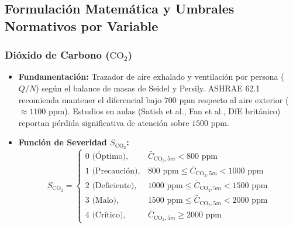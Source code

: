 \documentclass[11pt,a4paper]{article}
\begin{document}
\subsection{Formulación Matemática y Umbrales Normativos por Variable}

\subsubsection{Dióxido de Carbono (\texorpdfstring{$\text{CO}_2$}{CO2})}
\begin{itemize}
    \item \textbf{Fundamentación:} Trazador de aire exhalado y ventilación por persona ($Q/N$) según el balance de masas de Seidel y Persily. ASHRAE 62.1 recomienda mantener el diferencial bajo $700\text{ ppm}$ respecto al aire exterior ($\approx 1100\text{ ppm}$). Estudios en aulas (Satish et al., Fan et al., DfE británico) reportan pérdida significativa de atención sobre $1500\text{ ppm}$.
    \item \textbf{Función de Severidad $S_{\text{CO}_2}$:}
    \begin{equation}
    S_{\text{CO}_2} = \begin{cases}
    0\text{ (Óptimo)}, & \bar{C}_{\text{CO}_2, 5m} < 800\text{ ppm} \\
    1\text{ (Precaución)}, & 800\text{ ppm} \le \bar{C}_{\text{CO}_2, 5m} < 1000\text{ ppm} \\
    2\text{ (Deficiente)}, & 1000\text{ ppm} \le \bar{C}_{\text{CO}_2, 5m} < 1500\text{ ppm} \\
    3\text{ (Malo)}, & 1500\text{ ppm} \le \bar{C}_{\text{CO}_2, 5m} < 2000\text{ ppm} \\
    4\text{ (Crítico)}, & \bar{C}_{\text{CO}_2, 5m} \ge 2000\text{ ppm}
    \end{cases}
    \end{equation}
\end{itemize}
\end{document}
